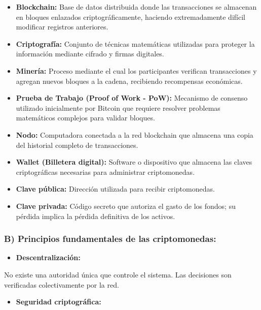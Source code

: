\documentclass[12pt,a4paper]{article}
\begin{document}
\begin{itemize}
  \item \textbf{Blockchain:} Base de datos distribuida donde las transacciones se almacenan en
        bloques enlazados criptográficamente, haciendo extremadamente difícil modificar
        registros anteriores.
  \item \textbf{Criptografía:} Conjunto de técnicas matemáticas utilizadas para proteger la
        información mediante cifrado y firmas digitales.
  \item \textbf{Minería:} Proceso mediante el cual los participantes verifican transacciones y
        agregan nuevos bloques a la cadena, recibiendo recompensas económicas.
  \item \textbf{Prueba de Trabajo (Proof of Work - PoW):} Mecanismo de consenso utilizado
        inicialmente por Bitcoin que requiere resolver problemas matemáticos complejos
        para validar bloques.
  \item \textbf{Nodo:} Computadora conectada a la red blockchain que almacena una copia del
        historial completo de transacciones.
  \item \textbf{Wallet (Billetera digital):} Software o dispositivo que almacena las claves
        criptográficas necesarias para administrar criptomonedas.
  \item \textbf{Clave pública:} Dirección utilizada para recibir criptomonedas.
  \item \textbf{Clave privada:} Código secreto que autoriza el gasto de los fondos; su pérdida
        implica la pérdida definitiva de los activos.
\end{itemize}

\subsubsection*{B) Principios fundamentales de las criptomonedas:}

\begin{itemize}
  \item \textbf{Descentralización:}
\end{itemize}

No existe una autoridad única que controle el sistema. Las decisiones son verificadas
colectivamente por la red.

\begin{itemize}
  \item \textbf{Seguridad criptográfica:}
\end{itemize}
\end{document}

